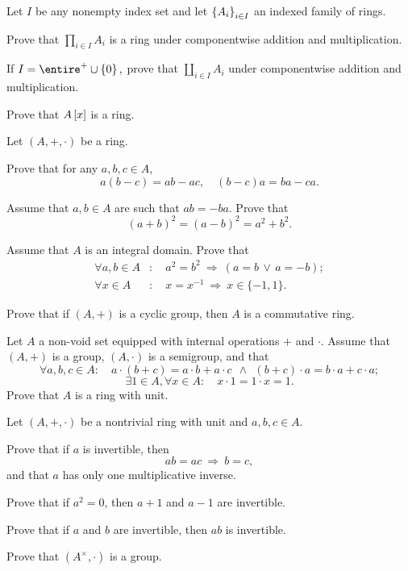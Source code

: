 \documentclass[
    11pt,a4paper,
]{exam}
\begin{document}
\begin{questions}
\begin{ejercicio}
Let $I$ be any nonempty index set and let $\left\lbrace A_i \right\rbrace_{i\in I}$ an indexed family of rings. 
\begin{my_enumerate}
    \item Prove that $\prod_{i\in I} A_i$ is a ring under componentwise addition and multiplication. 
    \item If $I=\entire^{+}\cup\adel{0},$ prove that $\coprod_{i\in I} A_i$  under componentwise addition and multiplication. 
    \item Prove that $A\left[x\right]$ is a ring. 
\end{my_enumerate}
\end{ejercicio}

\begin{ejercicio}
Let $(A,+,\cdot)$ be a ring.
\begin{my_enumerate}
\item Prove that for any $a,b,c\in A$,
$$
a(b-c) = ab - ac,
\quad
(b-c)a = ba - ca.
$$
\item Assume that $a,b\in A$ are such that $ab=-ba$. Prove that 
$$
(a+b)^2 = (a-b)^2 = a^2 + b^2.
$$
\item Assume that $A$ is an integral domain. Prove that
\begin{align*}
    \forall a,b\in A&:\quad a^2 = b^2 \: \Rightarrow \: (a=b\, \vee \, a=-b);\\
    \forall x\in A&:\quad
x = x^{-1}\: \Rightarrow \:
x \in \{-1,1\}.
\end{align*}
\item Prove that if $(A,+)$ is a cyclic group, then $A$ is a commutative ring.
\end{my_enumerate}
\end{ejercicio}


\begin{ejercicio}
 Let $A$ a non-void set equipped with internal operations $+$ and $\cdot$. Assume that $(A,+)$ is a group,
 $(A,\cdot)$ is a semigroup, and that
$$
\forall a,b,c \in A:\quad
a \cdot (b+c) = a\cdot b + a\cdot c
\:\: \wedge \:\:
(b+c)\cdot a = b\cdot a + c\cdot a;
$$
$$
\exists 1\in A, \forall x\in A:\quad
x\cdot 1 = 1\cdot x = 1.
$$
Prove that $A$ is a ring with unit.
\end{ejercicio}

\begin{ejercicio}
\label{ej:ejercicior2}
Let $(A,+,\cdot)$ be a nontrivial ring with unit and $a,b,c\in A$.
\begin{my_enumerate}
\item Prove that if $a$ is invertible, then 
$$
ab = ac \: \Rightarrow \: b=c,
$$
and that $a$ has only one multiplicative inverse.
%
\item Prove that if $a^2 = 0$, then $a+1$ and $a-1$ are invertible. 
\item Prove that if $a$ and $b$ are invertible, then $ab$ is invertible.
\item 
\label{pto:ayuda1}
 Prove that $(A^\times,\cdot)$ is a group.
\end{my_enumerate}
\end{ejercicio}


\end{questions}
\end{document}
